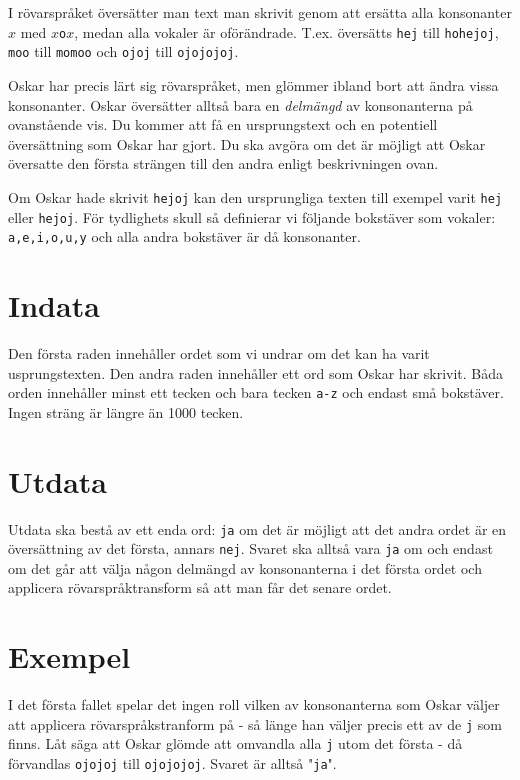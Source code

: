 I rövarspråket översätter man text man skrivit genom att ersätta alla konsonanter $x$ med $x$\texttt{o}$x$, medan alla vokaler är oförändrade. T.ex. översätts \texttt{hej} till \texttt{hohejoj}, \texttt{moo} till \texttt{momoo} och \texttt{ojoj} till \texttt{ojojojoj}.

Oskar har precis lärt sig rövarspråket, men glömmer ibland bort att ändra vissa konsonanter. Oskar översätter alltså bara en \emph{delmängd} av konsonanterna på ovanstående vis. Du kommer att få en ursprungstext och en potentiell översättning som Oskar har gjort. Du ska avgöra om det är möjligt att Oskar översatte den första strängen till den andra enligt beskrivningen ovan.

Om Oskar hade skrivit \texttt{hejoj} kan den ursprungliga texten till exempel varit \texttt{hej} eller \texttt{hejoj}. För tydlighets skull så definierar vi följande bokstäver som vokaler: \texttt{a,e,i,o,u,y} och alla andra bokstäver är då konsonanter.

\section*{Indata}
Den första raden innehåller ordet som vi undrar om det kan ha varit usprungstexten. Den andra raden innehåller ett ord som Oskar har skrivit. Båda orden innehåller minst ett tecken och bara tecken \texttt{a-z} och endast små bokstäver. Ingen sträng är längre än 1000 tecken.

\section*{Utdata}
Utdata ska bestå av ett enda ord: \texttt{ja} om det är möjligt att det andra ordet är en översättning av det första, annars \texttt{nej}. Svaret ska alltså vara \texttt{ja} om och endast om det går att välja någon delmängd av konsonanterna i det första ordet och applicera rövarspråktransform så att man får det senare ordet.

\section*{Exempel}
I det första fallet spelar det ingen roll vilken av konsonanterna som Oskar väljer att applicera rövarspråkstranform på - så länge han väljer precis ett av de \texttt{j} som finns. Låt säga att Oskar glömde att omvandla alla \texttt{j} utom det första - då förvandlas \texttt{ojojoj} till \texttt{ojojojoj}. Svaret är alltså "\texttt{ja}".

